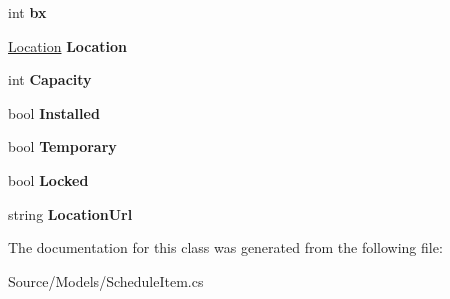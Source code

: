 \begin{DoxyCompactItemize}
\item 
int {\bfseries bx}\hypertarget{class_w_c_c_mobile_1_1_models_1_1_schedule_item_acd53e3ae65c390b85f709c78ea839214}{}\label{class_w_c_c_mobile_1_1_models_1_1_schedule_item_acd53e3ae65c390b85f709c78ea839214}

\item 
\hyperlink{struct_w_c_c_mobile_1_1_location}{Location} {\bfseries Location}\hypertarget{class_w_c_c_mobile_1_1_models_1_1_schedule_item_a994ac1beccddc5b04eda73b8f0a33bc2}{}\label{class_w_c_c_mobile_1_1_models_1_1_schedule_item_a994ac1beccddc5b04eda73b8f0a33bc2}

\item 
int {\bfseries Capacity}\hypertarget{class_w_c_c_mobile_1_1_models_1_1_schedule_item_adcb68af24eeae563aa5e98f2a9094632}{}\label{class_w_c_c_mobile_1_1_models_1_1_schedule_item_adcb68af24eeae563aa5e98f2a9094632}

\item 
bool {\bfseries Installed}\hypertarget{class_w_c_c_mobile_1_1_models_1_1_schedule_item_a4ba3ad838bb019296ce6a8cc90ff527a}{}\label{class_w_c_c_mobile_1_1_models_1_1_schedule_item_a4ba3ad838bb019296ce6a8cc90ff527a}

\item 
bool {\bfseries Temporary}\hypertarget{class_w_c_c_mobile_1_1_models_1_1_schedule_item_a899b7cd610777f8e88cbef5f13dcf417}{}\label{class_w_c_c_mobile_1_1_models_1_1_schedule_item_a899b7cd610777f8e88cbef5f13dcf417}

\item 
bool {\bfseries Locked}\hypertarget{class_w_c_c_mobile_1_1_models_1_1_schedule_item_a59b60f211a37137748beaba437da7afe}{}\label{class_w_c_c_mobile_1_1_models_1_1_schedule_item_a59b60f211a37137748beaba437da7afe}

\item 
string {\bfseries Location\+Url}\hypertarget{class_w_c_c_mobile_1_1_models_1_1_schedule_item_abcc77ea16b0e0d25262d94772096b9f2}{}\label{class_w_c_c_mobile_1_1_models_1_1_schedule_item_abcc77ea16b0e0d25262d94772096b9f2}

\end{DoxyCompactItemize}


The documentation for this class was generated from the following file\+:\begin{DoxyCompactItemize}
\item 
Source/\+Models/Schedule\+Item.\+cs\end{DoxyCompactItemize}
